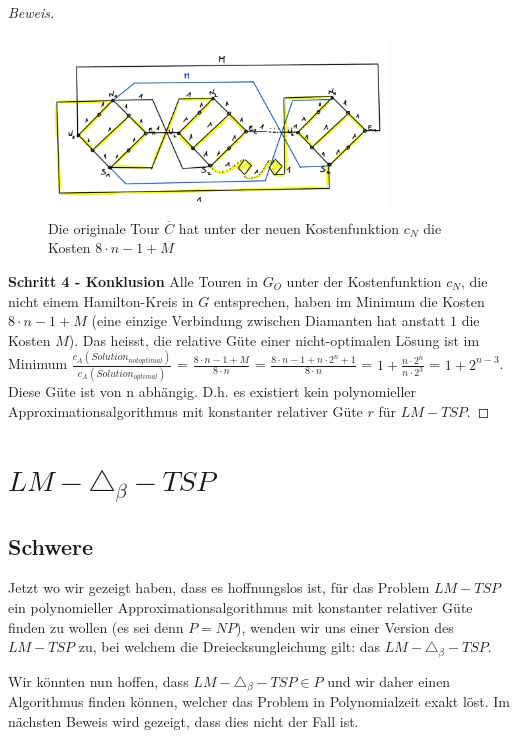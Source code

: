 \documentclass[a4paper,11pt]{scrreprt}
\begin{document}
\begin{proof}[Beweis]
\begin{figure}[H]
\centering
\includegraphics[width=0.8\textwidth]{lm_tsp_hard_new2.png}
\caption{Die originale Tour $\overline{C}$ hat unter der neuen Kostenfunktion $c_N$ die Kosten $8 \cdot n - 1 + M$}
\label{fig:lm-tsp-proof-step3}
\end{figure}

\textbf{Schritt 4 - Konklusion} Alle Touren in $G_O$ unter der Kostenfunktion $c_N$, die nicht einem Hamilton-Kreis in $G$ entsprechen, haben im Minimum die Kosten $8 \cdot n - 1 + M$ (eine einzige Verbindung zwischen Diamanten hat anstatt $1$ die Kosten $M$). Das heisst, die relative Güte einer nicht-optimalen Lösung ist im Minimum $\frac{c_A(Solution_{not optimal})}{c_A(Solution_{optimal})}$ = $\frac{8 \cdot n - 1 + M}{8 \cdot n}$ = $\frac{8 \cdot n - 1 + n \cdot 2^n + 1}{8 \cdot n}$ = $1 + \frac{n \cdot 2^n}{n \cdot 2^3}$ = $1 + 2^{n-3}$. Diese Güte ist von n abhängig. D.h. es existiert kein polynomieller Approximationsalgorithmus mit konstanter relativer Güte $r$ für $LM-TSP$.
\end{proof}

\section{$LM-\triangle_\beta-TSP$}

\subsection{Schwere}

Jetzt wo wir gezeigt haben, dass es hoffnungslos ist, für das Problem $LM-TSP$ ein polynomieller Approximationsalgorithmus mit konstanter relativer Güte finden zu wollen (es sei denn $P = NP$), wenden wir uns einer Version des $LM-TSP$ zu, bei welchem die Dreiecksungleichung gilt: das $LM - \triangle_\beta-TSP$. 

Wir könnten nun hoffen, dass $LM-\triangle_\beta-TSP \in P$ und wir daher einen Algorithmus finden können, welcher das Problem in Polynomialzeit exakt löst. Im nächsten Beweis wird gezeigt, dass dies nicht der Fall ist.
\end{document}
